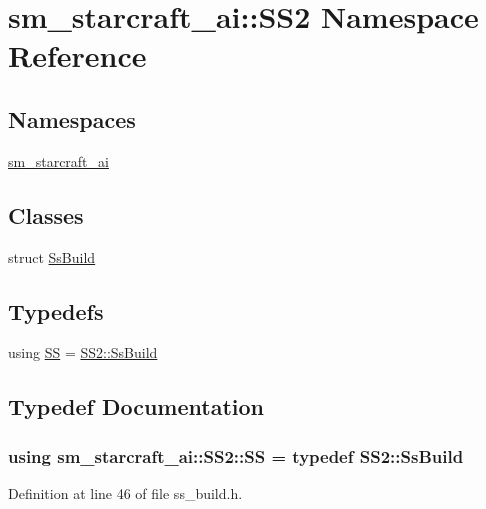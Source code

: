 \hypertarget{namespacesm__starcraft__ai_1_1SS2}{}\section{sm\+\_\+starcraft\+\_\+ai\+:\+:S\+S2 Namespace Reference}
\label{namespacesm__starcraft__ai_1_1SS2}
\subsection*{Namespaces}
\begin{DoxyCompactItemize}
\item 
 \hyperlink{namespacesm__starcraft__ai_1_1SS2_1_1sm__starcraft__ai}{sm\+\_\+starcraft\+\_\+ai}
\end{DoxyCompactItemize}
\subsection*{Classes}
\begin{DoxyCompactItemize}
\item 
struct \hyperlink{structsm__starcraft__ai_1_1SS2_1_1SsBuild}{Ss\+Build}
\end{DoxyCompactItemize}
\subsection*{Typedefs}
\begin{DoxyCompactItemize}
\item 
using \hyperlink{namespacesm__starcraft__ai_1_1SS2_ac575e5abdae90f9041a4178c966237f6}{SS} = \hyperlink{structsm__starcraft__ai_1_1SS2_1_1SsBuild}{S\+S2\+::\+Ss\+Build}
\end{DoxyCompactItemize}


\subsection{Typedef Documentation}
\subsubsection[{\texorpdfstring{SS}{SS}}]{\setlength{\rightskip}{0pt plus 5cm}using {\bf sm\+\_\+starcraft\+\_\+ai\+::\+S\+S2\+::\+SS} = typedef {\bf S\+S2\+::\+Ss\+Build}}\hypertarget{namespacesm__starcraft__ai_1_1SS2_ac575e5abdae90f9041a4178c966237f6}{}\label{namespacesm__starcraft__ai_1_1SS2_ac575e5abdae90f9041a4178c966237f6}


Definition at line 46 of file ss\+\_\+build.\+h.

